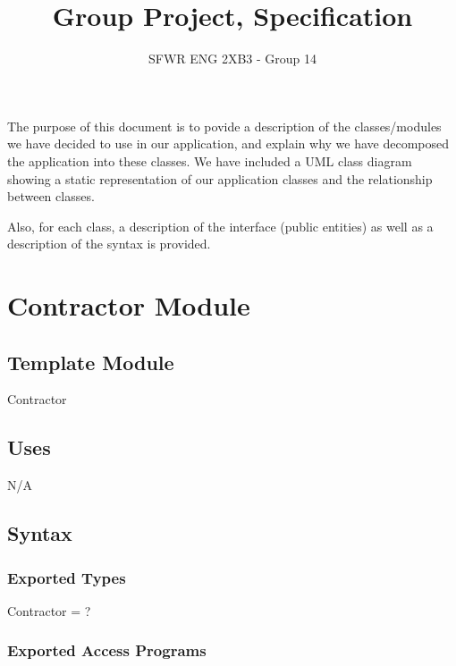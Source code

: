\documentclass[12pt]{article}
\title{Group Project, Specification}
\author{SFWR ENG 2XB3 - Group 14}
\begin{document}
\maketitle

The purpose of this document is to  povide a description of the classes/modules we have decided to use in our application, and explain why we have decomposed the application into these classes. We have included a UML class diagram showing a static representation of our application classes and the relationship between classes.

Also, for each class, a description of the interface (public entities) as well as a description of the syntax is provided.


\newpage

\section* {Contractor Module}

\subsection*{Template Module}

Contractor

\subsection* {Uses}

N/A

\subsection* {Syntax}

\subsubsection* {Exported Types}

Contractor = ?

\subsubsection* {Exported Access Programs}
\end{document}
